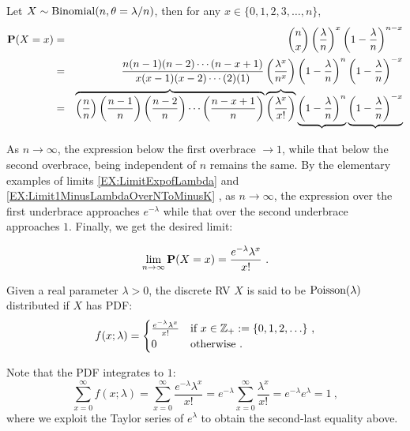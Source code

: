 Let $X \sim \mbox{{\rm Binomial}}(n,\theta=\lambda/n)$, then for any $x \in \{0,1,2,3,\ldots,n\}$,
\begin{eqnarray}
\mathbf{P}(X=x)
&=&
\binom{n}{x} \left( \frac{\lambda}{n} \right)^x \left( 1- \frac{\lambda}{n} \right)^{n-x} \notag \\
&=& \frac{n(n-1)(n-2)\cdots(n-x+1)}{x(x-1)(x-2)\cdots (2)(1)}
\left( \frac{\lambda^x}{n^x} \right)
\left( 1- \frac{\lambda}{n} \right)^n
\left( 1- \frac{\lambda}{n} \right)^{-x} \notag \\
&=&
\overbrace{\left( \frac{n}{n} \right) \left( \frac{n-1}{n} \right) \left( \frac{n-2}{n} \right) \cdots \left( \frac{n-x+1}{n} \right)}
\overbrace{\left( \frac{\lambda^x}{x!} \right)}
\underbrace{\left( 1- \frac{\lambda}{n} \right)^n}
\underbrace{\left( 1- \frac{\lambda}{n} \right)^{-x}}  \notag \\
\end{eqnarray}

As $n \to \infty$, the expression below the first overbrace $\to 1$, while that below the second overbrace, being independent of $n$ remains the same.  By the elementary examples of limits
\ref*{EX:LimitExpofLambda} and \ref*{EX:Limit1MinusLambdaOverNToMinusK}%
, as $n \to \infty$, the expression over the first underbrace approaches $e^{-\lambda}$ while that over the second underbrace approaches $1$.  Finally, we get the desired limit:

\[
\lim_{n \to \infty} \mathbf{P}(X=x)
= \frac{ e^{-\lambda} \lambda^x}{x!}  \ .
\]
\begin{model}\label{M:Poisson}
Given a real parameter $\lambda>0$, the discrete RV $X$ is said to be $\mbox{{\rm Poisson}}(\lambda)$ distributed if $X$ has PDF:
\begin{equation}\label{E:Poissonpdf}
f(x;\lambda) =
\begin{cases}
 \frac{ e^{-\lambda} \lambda^x}{x!} & \text{if $x \in \mathbb{Z}_+ := \{0,1,2,\ldots\}$} \ , \\
0 & \text{otherwise} \ .
\end{cases}
\end{equation}

Note that the PDF integrates to $1$:
\[
\sum_{x=0}^{\infty} f(x;\lambda)
= \sum_{x=0}^{\infty}  \frac{ e^{-\lambda} \lambda^x}{x!}
=  e^{-\lambda} \sum_{x=0}^{\infty}  \frac{\lambda^x}{x!}
=  e^{-\lambda} e^{\lambda}
= 1 \ ,
\]
where we exploit the Taylor series of $e^{\lambda}$ to obtain the second-last equality above.
\end{model}

